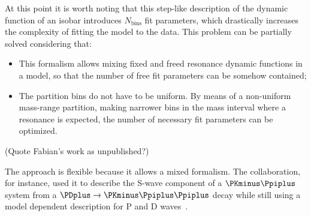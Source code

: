     At this point it is worth noting that this step-like description of the dynamic function of an isobar introduces $N_\text{bins}$ fit parameters, which drastically increases the complexity of fitting the model to the data.
    This problem can be partially solved considering that:
    \begin{itemize}
        \item 
            This formalism allows mixing fixed and freed resonance dynamic functions in a model, so that the number of free fit parameters can be somehow contained;
        \item
            The partition bins do not have to be uniform. By means of a non-uniform mass-range partition, making narrower bins in the mass interval where a resonance is expected, the number of necessary fit parameters can be optimized.
    \end{itemize}

    {\color{red}
    (Quote Fabian's work as unpublished?)
    }


    The approach is flexible because it allows a mixed formalism.
    The \focus{} collaboration, for instance, used it to describe the S-wave component of a $\PKminus\Ppiplus$ system from a $\PDplus \to \PKminus\Ppiplus\Ppiplus$ decay while still using a model dependent description for P and D waves~\cite{Link200914}.
